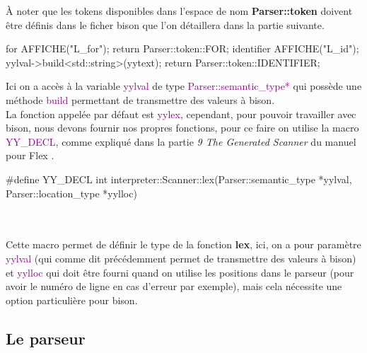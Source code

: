 \documentclass[a4paper]{article}%
\begin{document}
À noter que les tokens disponibles dans l'espace de nom \textbf{Parser::token}
doivent être définis dans le ficher bison que l'on détaillera dans la partie
suivante.

\begin{code}
for          { AFFICHE("L_for"); return Parser::token::FOR; }
{identifier} {
  AFFICHE("L_id");
  yylval->build<std::string>(yytext);
  return Parser::token::IDENTIFIER;
}
\end{code}\leavevmode\newline

\noindent

Ici on a accès à la variable \textcolor{purple}{yylval} de type
\textcolor{purple}{Parser::semantic\_type*} qui possède une méthode
\textcolor{purple}{build} permettant de transmettre des valeurs à bison.\\


La fonction appelée par défaut est \textcolor{purple}{yylex}, cependant, pour
pouvoir travailler avec bison, nous devons fournir nos propres fonctions, pour
ce faire on utilise la macro \textcolor{purple}{YY\_DECL}, comme expliqué dans
la partie \textit{9 The Generated Scanner} du manuel pour Flex
\cite{flexmanual}.

\begin{code}
#define YY_DECL int interpreter::Scanner::lex(Parser::semantic_type *yylval, Parser::location_type *yylloc)
\end{code}\leavevmode\\~\\

Cette macro permet de définir le type de la fonction \textbf{lex}, ici,
on a pour paramètre \textcolor{purple}{yylval} (qui comme dit précédemment permet
de transmettre des valeurs à bison) et \textcolor{purple}{yylloc} qui doit être
fourni quand on utilise les positions dans le parseur (pour avoir le numéro de
ligne en cas d'erreur par exemple), mais cela nécessite une option particulière
pour bison.

\clearpage{}

\subsection{Le parseur}
\end{document}

